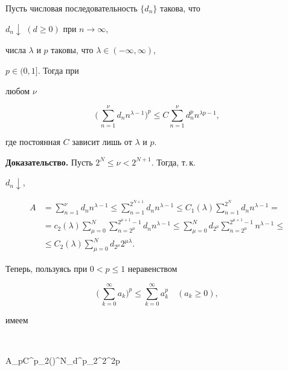\begin{lem} Пусть числовая последовательность $\{d_n\}$ такова, что 


$d_n\downarrow$ $(d\ge 0)$ при $n\to\infty$, 


числа $\lambda$ и $p$ таковы, что $\lambda\in(-\infty,\infty)$, 


$p\in(0,1]$. Тогда при 


любом $\nu$ 


$$ 


\biggl(\,\sum^\nu_{n=1}d_nn^{\lambda-1}\biggr)^p \le 


C\sum^\nu_{n=1}d_n^pn^{\lambda p-1}, 


$$ 


где постоянная $C$ зависит лишь от $\lambda$ и $p$. 


\end{lem} 


 


{\bf Доказательство.} Пусть $2^N\le\nu<2^{N+1}$. Тогда, т.\,к. 


$d_n\downarrow$, 


\begin{align*} 


A &=\sum^\nu_{n=1}d_n n^{\lambda-1}\le\sum^{2^{N+1}}_{n=1} 


d_n n^{\lambda-1} \le C_1(\lambda)\sum^{2^N}_{n=1}d_n n^{\lambda-1}=\\ 


% 


&= c_2(\lambda)\sum^N_{\mu=0}\sum^{2^{\mu+1}-1}_{n=2^\mu}d_n n^{\lambda-1} 


\le\sum^N_{\mu=0}d_{2^\mu}\sum^{2^{\mu+1}-1}_{n=2^\mu}n^{\lambda-1}\le\\ 


% 


&\le C_2(\lambda)\sum^N_{\mu=0}d_{2^\mu}2^{\mu\lambda}. 


\end{align*} 


Теперь, пользуясь при $0<p\le 1$ неравенством 


$$ 


\biggl(\,\sum^\infty_{k=0}a_k\biggr)^p\le \sum^\infty_{k=0} 


a^p_k \quad(a_k\ge 0), 


$$ 


имеем 


$$ 


A_p\le C^p_2(\lambda)\sum^N_{}d^p_{2^\mu}2^{2\mu\lambda p}\le 


